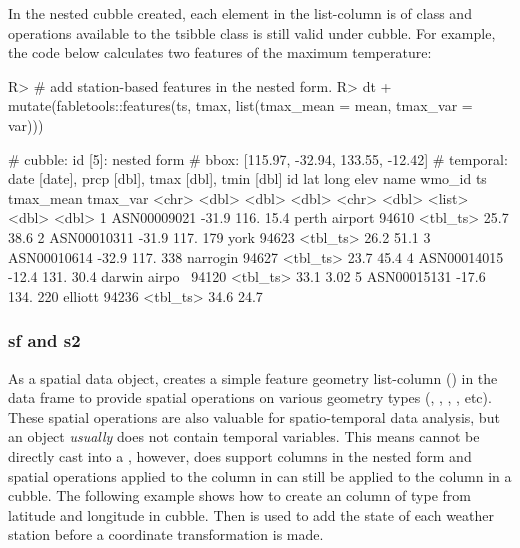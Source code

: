 \documentclass[
]{jss}
\begin{document}
In the nested cubble created, each element in the list-column 
is of  class and operations available to the tsibble class
is still valid under cubble. For example, the code below calculates two
features of the maximum temperature:

\begin{CodeChunk}
\begin{CodeInput}
R> # add station-based features in the nested form.
R> dt %
+   mutate(fabletools::features(ts, tmax, list(tmax_mean = mean, tmax_var = var)))
\end{CodeInput}
\begin{CodeOutput}
# cubble:   id [5]: nested form
# bbox:     [115.97, -32.94, 133.55, -12.42]
# temporal: date [date], prcp [dbl], tmax [dbl], tmin [dbl]
  id            lat  long  elev name          wmo_id ts       tmax_mean tmax_var
  <chr>       <dbl> <dbl> <dbl> <chr>          <dbl> <list>       <dbl>    <dbl>
1 ASN00009021 -31.9  116.  15.4 perth airport  94610 <tbl_ts>      25.7    38.6 
2 ASN00010311 -31.9  117. 179   york           94623 <tbl_ts>      26.2    51.1 
3 ASN00010614 -32.9  117. 338   narrogin       94627 <tbl_ts>      23.7    45.4 
4 ASN00014015 -12.4  131.  30.4 darwin airpo~  94120 <tbl_ts>      33.1     3.02
5 ASN00015131 -17.6  134. 220   elliott        94236 <tbl_ts>      34.6    24.7 
\end{CodeOutput}
\end{CodeChunk}

\hypertarget{sf-and-s2}{%
\subsubsection{sf and s2}\label{sf-and-s2}}

As a spatial data object,  creates a simple feature geometry
list-column () in the data frame to provide spatial operations
on various geometry types (, ,
, , etc). These spatial operations are
also valuable for spatio-temporal data analysis, but an  object
\emph{usually} does not contain temporal variables. This means 
cannot be directly cast into a , however, 
does support  columns in the nested form and spatial
operations applied to the  column in  can still be
applied to the  column in a cubble. The following example
shows how to create an  column of  type from
latitude and longitude in cubble. Then  is used to
add the state  of each weather station before a
coordinate transformation is made.
\end{document}
